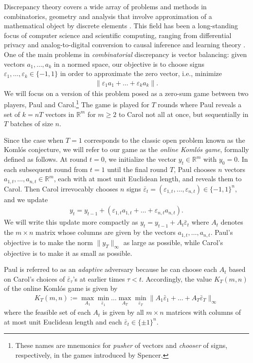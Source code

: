 \documentclass[reqno]{amsart}
\numberwithin{equation}{section}
\newcommand{\eps}{\varepsilon}
\begin{document}
Discrepancy theory covers a wide array of problems and methods in combinatorics, geometry and analysis  that involve approximation of a mathematical object by discrete elements  \cite{Matousek99,Travaglini14}. This field has been a long-standing focus of computer science and  scientific computing, ranging from  differential privacy and analog-to-digital conversion  to causal inference and  learning theory \cite{Chazelle2000,   CST14, Gunturk12, NTZ13, HSS24,APZ19}.  One of the main problems in \emph{combinatorial} discrepancy is vector balancing: given vectors $a_1,\ldots,a_k$ in a normed space,  our objective is to choose signs $\varepsilon_1,\ldots,\varepsilon_k \in \{-1,1\}$ in order to approximate the zero vector, i.e., minimize
\begin{align*}
  \| \varepsilon_1a_1+\ldots+\varepsilon_k a_k\|.
\end{align*}
We will focus on a version of this problem  posed as a zero-sum game between two players, Paul and Carol.\footnote{These names are mnemonics for \emph{pusher} of vectors and  \emph{chooser} of  signs, respectively, in the games introduced by Spencer.} The game is played for $T$ rounds where Paul reveals a set of $k=n T$ vectors  in  $\mathbb{R}^m$ for $m \geq 2$ to Carol not all at once, but sequentially in $T$ batches of size $n$.

Since the case when $T=1$  corresponds to the classic open problem  known as the Koml\'os conjecture, we will refer to our game as the \emph{online Koml\'os game}, formally defined as follows. At round $t=0$, we initialize the vector $y_t \in \mathbb{R}^m$ with $y_0 = 0$. In each subsequent round from $t= 1$ until the final round $T$, Paul chooses $n$ vectors $a_{1,t},\ldots,a_{n,t} \in \mathbb{R}^m$, each with at most unit Euclidean length, and reveals them to Carol. Then Carol irrevocably chooses $n$ signs $\bar \varepsilon_t = (\varepsilon_{1,t},\ldots,\varepsilon_{n,t}) \in \{-1,1\}^n$, and we  update
\begin{align*}
  y_{t} = y_{t-1}+(\varepsilon_{1,t}a_{1,t}+\ldots+ \varepsilon_{n,t}a_{n,t}).
\end{align*}
We will write this update  more compactly as $y_{t} = y_{t-1} + A_t\bar \varepsilon_t$ where $A_t$ denotes the $m \times n$ matrix whose columns are given by the vectors $a_{1,t},\ldots,a_{n,t} $. Paul's objective is to make the norm $\|y_T\|_\infty$ as large as possible, while Carol's objective is to make it as small as possible.  

Paul is referred to as an \emph{adaptive} adversary because he can choose each $A_t$ based on Carol's choices of $\bar \eps_\tau$'s at earlier times $\tau <t$. Accordingly, the  value $K_{T}(m,n)$ of the online Koml\'os  game is given by 
\begin{align}\label{e:online Komlos}
  K_{T}(m,n) := \max_{A_1}\min_{\bar \varepsilon_1} \ldots \max_{A_T}\min_{\bar \varepsilon_T}\|A_1\bar \varepsilon_1+\ldots+A_T\bar \varepsilon_T\|_\infty
\end{align}
where the feasible set of each $A_t$ is given by all $m \times n$ matrices with columns of at most unit Euclidean length  and each $\bar \eps_t \in \{\pm 1 \}^n$.  
\end{document}
